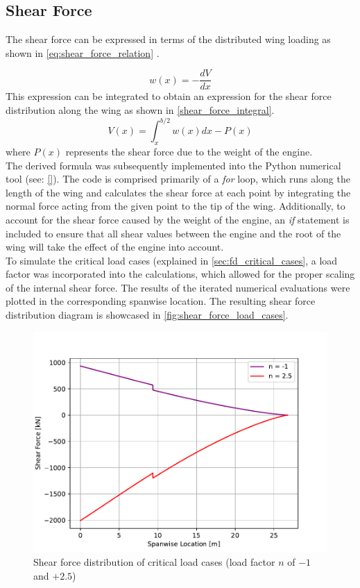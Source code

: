 \subsection*{Shear Force}
\noindent The shear force can be expressed in terms of the distributed wing loading as shown in \autoref{eq:shear_force_relation} \cite[p. 28]{Timmer2024AE2111-IReader}.

\begin{equation} \label{eq:shear_force_relation}
    w(x) = -\frac{dV}{dx}
\end{equation}
\noindent This expression can be integrated to obtain an expression for the shear force distribution along the wing as shown in \autoref{shear_force_integral}.
\begin{equation} \label{shear_force_integral}
    V(x) = \int^{b/2}_x{w(x)dx} - P(x)
\end{equation}
where $P(x)$ represents the shear force due to the weight of the engine.\\
The derived formula was subsequently implemented into the Python numerical tool (see: \autoref{}). The code is comprised primarily of a \textit{for} loop, which runs along the length of the wing and calculates the shear force at each point by integrating the normal force acting from the given point to the tip of the wing. Additionally, to account for the shear force caused by the weight of the engine, an \textit{if} statement is included to ensure that all shear values between the engine and the root of the wing will take the effect of the engine into account.\\

\noindent To simulate the critical load cases (explained in \autoref{sec:fd_critical_cases}, a load factor was incorporated into the calculations, which allowed for the proper scaling of the internal shear force. The results of the iterated numerical evaluations were plotted in the corresponding spanwise location. The resulting shear force distribution diagram is showcased in \autoref{fig:shear_force_load_cases}.

\begin{figure}[H]
    \centering
    \includegraphics[width=0.8\linewidth]{figures/Shear_Force.pdf}
    \caption{Shear force distribution of critical load cases (load factor $n$ of $-1$ and $+2.5$)}
    \label{fig:shear_force_load_cases}
\end{figure}

